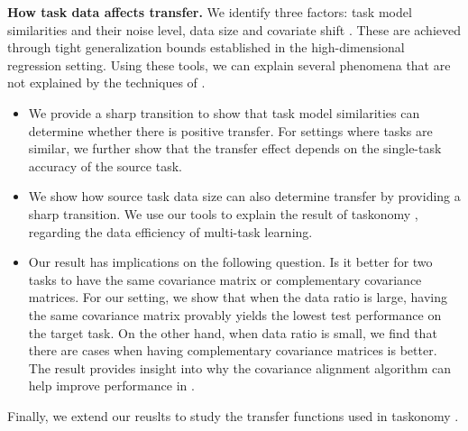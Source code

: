 \textbf{How task data affects transfer.}
	We identify three factors: task model similarities and their noise level, data size and covariate shift \cite{PY09,K18}.
	These are achieved through tight generalization bounds established in the high-dimensional regression setting.
	Using these tools, we can explain several phenomena that are not explained by the techniques of \cite{WZR20}.
	\begin{itemize}
		\item We provide a sharp transition to show that task model similarities can determine whether there is positive transfer.
		For settings where tasks are similar, we further show that the transfer effect depends on the single-task accuracy of the source task.
		\item We show how source task data size can also determine transfer by providing a sharp transition.
		We use our tools to explain the result of taskonomy \cite{ZSSGM18}, regarding the data efficiency of multi-task learning.
		\item Our result has implications on the following question.
	Is it better for two tasks to have the same covariance matrix or complementary covariance matrices.
	For our setting, we show that when the data ratio is large, having the same covariance matrix provably yields the lowest test performance on the target task.
	On the other hand, when data ratio is small, we find that there are cases when having complementary covariance matrices is better.
	The result provides insight into why the covariance alignment algorithm can help improve performance in \cite{WZR20}.
	\end{itemize}

Finally, we extend our reuslts to study the transfer functions used in taskonomy \cite{ZSSGM18}.



